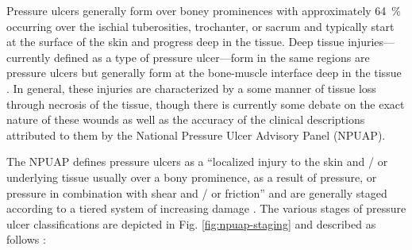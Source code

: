 		Pressure ulcers generally form over boney prominences with approximately \SI{64}{\percent} occurring over the ischial tuberosities, trochanter, or sacrum \cite{garber03} and typically start at the surface of the skin and progress deep in the tissue. Deep tissue injuries---currently defined as a type of pressure ulcer---form in the same regions are pressure ulcers but generally form at the bone-muscle interface deep in the tissue \cite{kanno09}. In general, these injuries are characterized by a some manner of tissue loss through necrosis of the tissue, though there is currently some debate on the exact nature of these wounds as well as the accuracy of the clinical descriptions attributed to them by the National Pressure Ulcer Advisory Panel (NPUAP).

		The NPUAP defines pressure ulcers as a ``localized injury to the skin and / or underlying tissue usually over a bony prominence, as a result of pressure, or pressure in combination with shear and / or friction'' and are generally staged according to a tiered system of increasing damage \cite{npuap07}. The various stages of pressure ulcer classifications are depicted in Fig. \ref{fig:npuap-staging} and described as follows \cite{npuap07}:

